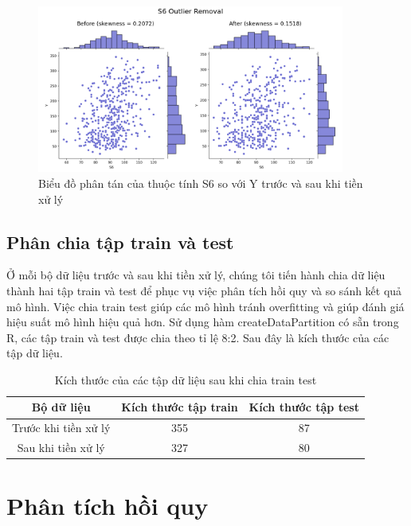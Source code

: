 \documentclass[runningheads]{llncs}
\begin{document}
\begin{figure}[H]
\centering
\includegraphics[width=0.9\textwidth]{S6OR}
\caption{Biểu đồ phân tán của thuộc tính S6 so với Y trước và sau khi tiền xử lý} \label{fig2}
\end{figure}

\subsection{Phân chia tập train và test}

Ở mỗi bộ dữ liệu trước và sau khi tiền xử lý, chúng tôi tiến hành chia dữ liệu thành hai tập train và test để phục vụ việc phân tích hồi quy và so sánh kết quả mô hình. Việc chia train test giúp các mô hình tránh overfitting và giúp đánh giá hiệu suất mô hình hiệu quả hơn. Sử dụng hàm createDataPartition có sẵn trong R, các tập train và test được chia theo tỉ lệ 8:2. Sau đây là kích thước của các tập dữ liệu.

\begin{table}
	\setlength{\tabcolsep}{0.5em}
	\renewcommand{\arraystretch}{1.4}
	\begin{center}
		\caption{Kích thước của các tập dữ liệu sau khi chia train test}\label{tab3}
		\begin{tabular}{|c|c|c|}
			\hline
			Bộ dữ liệu&Kích thước tập train&Kích thước tập test\\
			\hline
			Trước khi tiền xử lý&355&87\\
			\hline
			Sau khi tiền xử lý&327&80\\
			\hline
		\end{tabular}			
	\end{center}
\end{table}

\section{Phân tích hồi quy}
\end{document}
